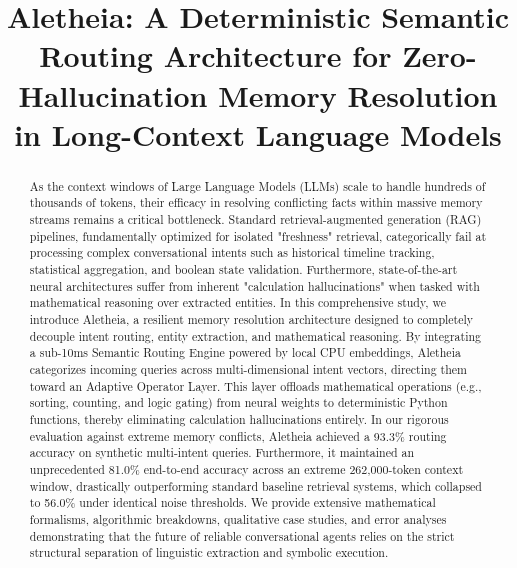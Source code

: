 \documentclass[journal,10pt]{IEEEtran}
\begin{document}
\title{Aletheia: A Deterministic Semantic Routing Architecture for Zero-Hallucination Memory Resolution in Long-Context Language Models}

\author{
\and
{}
}

\maketitle

\begin{abstract}
As the context windows of Large Language Models (LLMs) scale to handle hundreds of thousands of tokens, their efficacy in resolving conflicting facts within massive memory streams remains a critical bottleneck. Standard retrieval-augmented generation (RAG) pipelines, fundamentally optimized for isolated "freshness" retrieval, categorically fail at processing complex conversational intents such as historical timeline tracking, statistical aggregation, and boolean state validation. Furthermore, state-of-the-art neural architectures suffer from inherent "calculation hallucinations" when tasked with mathematical reasoning over extracted entities. In this comprehensive study, we introduce Aletheia, a resilient memory resolution architecture designed to completely decouple intent routing, entity extraction, and mathematical reasoning. By integrating a sub-10ms Semantic Routing Engine powered by local CPU embeddings, Aletheia categorizes incoming queries across multi-dimensional intent vectors, directing them toward an Adaptive Operator Layer. This layer offloads mathematical operations (e.g., sorting, counting, and logic gating) from neural weights to deterministic Python functions, thereby eliminating calculation hallucinations entirely. In our rigorous evaluation against extreme memory conflicts, Aletheia achieved a 93.3\% routing accuracy on synthetic multi-intent queries. Furthermore, it maintained an unprecedented 81.0\% end-to-end accuracy across an extreme 262,000-token context window, drastically outperforming standard baseline retrieval systems, which collapsed to 56.0\% under identical noise thresholds. We provide extensive mathematical formalisms, algorithmic breakdowns, qualitative case studies, and error analyses demonstrating that the future of reliable conversational agents relies on the strict structural separation of linguistic extraction and symbolic execution.
\end{abstract}
\end{document}
